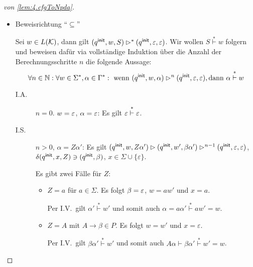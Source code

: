 \begin{proof}[von \autoref{lem:4.cfgToNpda}]
\begin{itemize}
        Per Konstruktion gilt $(\qinit, BC) \in \delta(\qinit, \Eps, A)$. 

        Ferner gilt per I.V., dass $(\qinit, Y(\mathcal{T}_1), B) \ConfRel^* (\qinit, \Eps, \Eps)$ und $(\qinit, Y(\mathcal{T}_2), C) \ConfRel^* (\qinit, \Eps, \Eps)$.

        Mit \autoref{lem:4.mehrKeller} folgt schließlich:
        \begin{align*}
          (\qinit, w, A) = (\qinit, Y(\mathcal{T}_1)Y(\mathcal{T}_2), A) &\ConfRel (\qinit, Y(\mathcal{T}_1)Y(\mathcal{T}_2), BC) \\
          &\ConfRel^* (\qinit, Y(\mathcal{T}_2), C) \\
          &\ConfRel^* (\qinit, \Eps, \Eps).
        \end{align*}
 \item Beweisrichtung  ``$\subseteq$''
 
 Sei $w\in L(\mathcal{K})$, dann gilt $(q^\mathsf{init}, w, S) \rhd^* (q^\mathsf{init}, \varepsilon, \varepsilon)$.
 Wir wollen $S \stackrel{*}{\vdash} w$ folgern und beweisen dafür via vollständige Induktion über die Anzahl der Berechnungsschritte $n$ die folgende Aussage:
     \begin{displaymath}
      \forall n \in \mathbb{N}: \forall w \in \Sigma^*, \alpha \in \Gamma^*: \text{ wenn } (q^\mathsf{init}, w, \alpha) \rhd^n (q^\mathsf{init}, \varepsilon, \varepsilon), \text{dann } \alpha \stackrel{*}{\vdash} w
    \end{displaymath}
    
    \begin{description}
    \item[I.A.] $n = 0$.
      $w = \varepsilon$, $\alpha = \varepsilon$: Es gilt $\varepsilon \stackrel{*}{\vdash} \varepsilon$.

  \item[I.S.] $n > 0$, $\alpha = Z\alpha'$: Es gilt
    $(q^\mathsf{init},w,Z\alpha') \rhd (q^\mathsf{init}, w', \beta\alpha') \rhd^{n-1} (q^\mathsf{init}, \varepsilon, \varepsilon)$, \linebreak
    $\delta(q^\mathsf{init}, x, Z) \ni (q^\mathsf{init}, \beta)$, $x \in \Sigma \cup \{\varepsilon\}$.

    Es gibt zwei Fälle für $Z$:
    \begin{itemize}
    \item $Z = a$ für $a \in \Sigma$.
%
      Es folgt $\beta = \varepsilon$, $w = aw'$ und $x = a$.

      Per I.V.\ gilt $\alpha' \stackrel{*}{\vdash} w'$ und somit auch $\alpha = a\alpha' \stackrel{*}{\vdash}aw' = w$.
    \item $Z = A$ mit $A \to \beta \in P$.
%
      Es folgt $w = w'$ und $x = \varepsilon$.

      Per I.V.\ gilt $\beta\alpha' \stackrel{*}{\vdash} w'$ und somit auch $A\alpha \vdash \beta\alpha' \stackrel{*}{\vdash} w' = w$.
      \qedhere
    \end{itemize}
    \end{description}
\end{itemize}
\end{proof}

